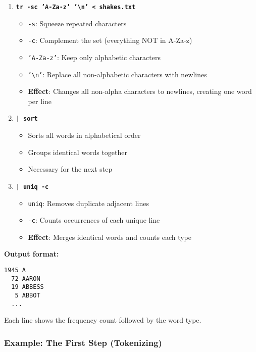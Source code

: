 \documentclass[11pt,a4paper]{article}
\theoremstyle{definition}
\theoremstyle{plain}
\theoremstyle{remark}
\begin{document}
\begin{enumerate}
    \item \textbf{\texttt{tr -sc 'A-Za-z' '\textbackslash n' < shakes.txt}}
    \begin{itemize}
        \item \texttt{-s}: Squeeze repeated characters
        \item \texttt{-c}: Complement the set (everything NOT in A-Za-z)
        \item \texttt{'A-Za-z'}: Keep only alphabetic characters
        \item \texttt{'\textbackslash n'}: Replace all non-alphabetic characters with newlines
        \item \textbf{Effect}: Changes all non-alpha characters to newlines, creating one word per line
    \end{itemize}
    
    \item \textbf{\texttt{| sort}}
    \begin{itemize}
        \item Sorts all words in alphabetical order
        \item Groups identical words together
        \item Necessary for the next step
    \end{itemize}
    
    \item \textbf{\texttt{| uniq -c}}
    \begin{itemize}
        \item \texttt{uniq}: Removes duplicate adjacent lines
        \item \texttt{-c}: Counts occurrences of each unique line
        \item \textbf{Effect}: Merges identical words and counts each type
    \end{itemize}
\end{enumerate}

\textbf{Output format:}
\begin{verbatim}
1945 A
  72 AARON
  19 ABBESS
   5 ABBOT
  ...
\end{verbatim}

Each line shows the frequency count followed by the word type.

\subsubsection{Example: The First Step (Tokenizing)}
\end{document}
